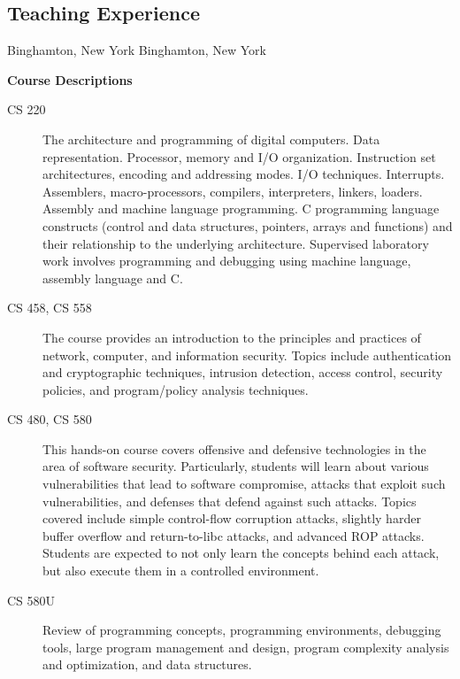 \documentclass[letterpaper,nolmodern]{moderncv}
\begin{document}
\subsection{Teaching Experience}
     {Binghamton, New York}{}
     {
     }
     {Binghamton, New York}{}
     {
     }

\textbf{Course Descriptions}
\begin{description}
	\item[CS 220] The architecture and programming of digital computers. Data representation. Processor, memory and I/O organization. Instruction set architectures, encoding and addressing modes. I/O techniques. Interrupts. Assemblers, macro-processors, compilers, interpreters, linkers, loaders. Assembly and machine language programming. C programming language constructs (control and data structures, pointers, arrays and functions) and their relationship to the underlying architecture. Supervised laboratory work involves programming and debugging using machine language, assembly language and C.
	\item[CS 458, CS 558] The course provides an introduction to the principles and practices of network, computer, and information security. Topics include authentication and cryptographic techniques, intrusion detection, access control, security policies, and program/policy analysis techniques.
	\item[CS 480, CS 580] This hands-on course covers offensive and defensive technologies in the area of software security. Particularly, students will learn about various vulnerabilities that lead to software compromise, attacks that exploit such vulnerabilities, and defenses that defend against such attacks. Topics covered include simple control-flow corruption attacks, slightly harder buffer overflow and return-to-libc attacks, and advanced ROP attacks. Students are expected to not only learn the concepts behind each attack, but also execute them in a controlled environment.
	\item[CS 580U] Review of programming concepts, programming environments, debugging tools, large program management and design, program complexity analysis and optimization, and data structures.
\end{description}
\end{document}
